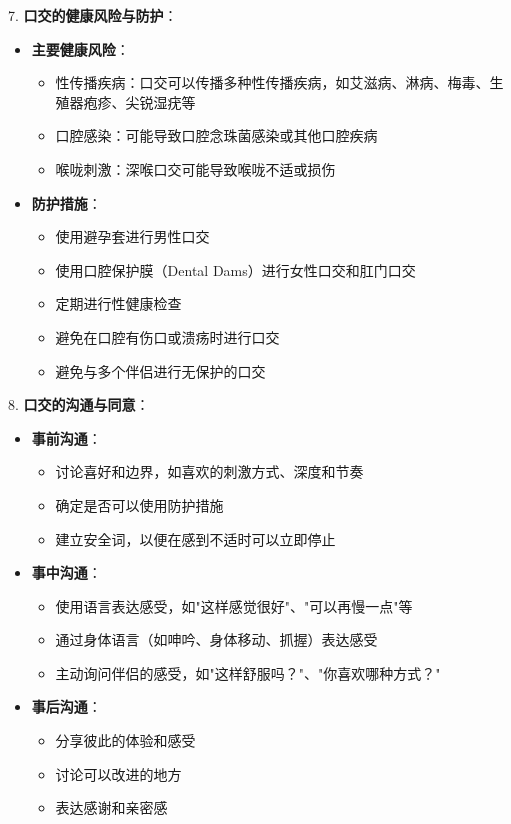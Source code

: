 \documentclass[12pt,UTF8]{ctexbook}
\begin{document}
7. \textbf{口交的健康风险与防护}：
\begin{itemize}
	\item \textbf{主要健康风险}：
	\begin{itemize}
		\item 性传播疾病：口交可以传播多种性传播疾病，如艾滋病、淋病、梅毒、生殖器疱疹、尖锐湿疣等
		\item 口腔感染：可能导致口腔念珠菌感染或其他口腔疾病
		\item 喉咙刺激：深喉口交可能导致喉咙不适或损伤
	\end{itemize}
	\item \textbf{防护措施}：
	\begin{itemize}
		\item 使用避孕套进行男性口交
		\item 使用口腔保护膜（Dental Dams）进行女性口交和肛门口交
		\item 定期进行性健康检查
		\item 避免在口腔有伤口或溃疡时进行口交
		\item 避免与多个伴侣进行无保护的口交
	\end{itemize}
\end{itemize}

8. \textbf{口交的沟通与同意}：
\begin{itemize}
	\item \textbf{事前沟通}：
	\begin{itemize}
		\item 讨论喜好和边界，如喜欢的刺激方式、深度和节奏
		\item 确定是否可以使用防护措施
		\item 建立安全词，以便在感到不适时可以立即停止
	\end{itemize}
	\item \textbf{事中沟通}：
	\begin{itemize}
		\item 使用语言表达感受，如"这样感觉很好"、"可以再慢一点"等
		\item 通过身体语言（如呻吟、身体移动、抓握）表达感受
		\item 主动询问伴侣的感受，如"这样舒服吗？"、"你喜欢哪种方式？"
	\end{itemize}
	\item \textbf{事后沟通}：
	\begin{itemize}
		\item 分享彼此的体验和感受
		\item 讨论可以改进的地方
		\item 表达感谢和亲密感
	\end{itemize}
\end{itemize}
\end{document}
